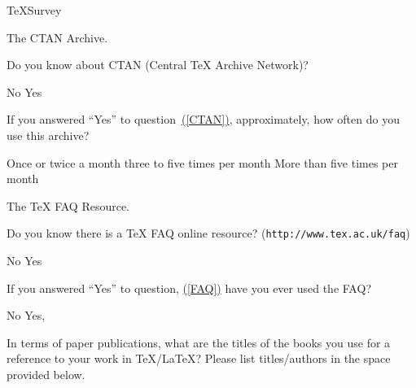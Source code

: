 \documentclass{article}
\begin{document}
\begin{exam}{TeXSurvey}
\begin{problem*}
The \textsf{CTAN} Archive.
\begin{parts}
\item\label{CTAN} Do you know about \textsf{CTAN} (Central {\TeX} Archive Network)?
  \begin{answers}{4}
    \bChoices
         No\eAns
         Yes\eAns
    \eChoices
  \end{answers}

\item If you answered ``Yes'' to question~\hyperref[CTAN]{(\ref*{CTAN})}, approximately, how often
      do you use this archive?
  \begin{answers}{3}
    \bChoices
         Once or twice a month\eAns
         three to five times per month\eAns
         More than five times per month\eAns
    \eChoices
  \end{answers}

\end{parts}
\end{problem*}

\begin{problem*}
The {\TeX} \textsf{FAQ} Resource.
\begin{parts}
\item\label{FAQ} Do you know there is a {\TeX} \textsf{FAQ} online resource? (\texttt{http://www.tex.ac.uk/faq})
  \begin{answers}{4}
    \bChoices
         No\eAns
         Yes\eAns
    \eChoices
  \end{answers}

\item\label{FAQ1} If you answered ``Yes'' to question, \hyperref[FAQ]{(\ref*{FAQ})} have you ever used the \textsf{FAQ}?
  \begin{answers}{4}
    \bChoices
         No\eAns
         Yes, \eAns
    \eChoices
  \end{answers}
\end{parts}
\end{problem*}

\begin{problem}
In terms of paper publications, what are the titles of the books you use for a reference to your
work in \TeX/\LaTeX? Please list titles/authors in the space provided below.
\begin{solution}[1.8in]
\end{solution}
\end{problem}


\end{exam}
\end{document}
